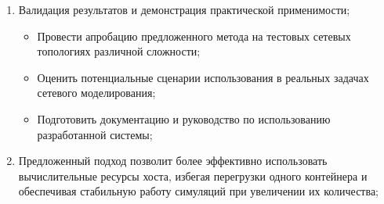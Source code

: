 \begin{enumerate}
    \item Валидация результатов и демонстрация практической применимости;
        \begin{itemize}
            \item Провести апробацию предложенного метода на тестовых сетевых топологиях различной сложности;
            \item Оценить потенциальные сценарии использования в реальных задачах сетевого моделирования;
            \item Подготовить документацию и руководство по использованию разработанной системы;
        \end{itemize}
    \item Предложенный подход позволит более эффективно использовать вычислительные ресурсы хоста, избегая перегрузки одного контейнера и обеспечивая стабильную работу симуляций при увеличении их количества;
\end{enumerate}
